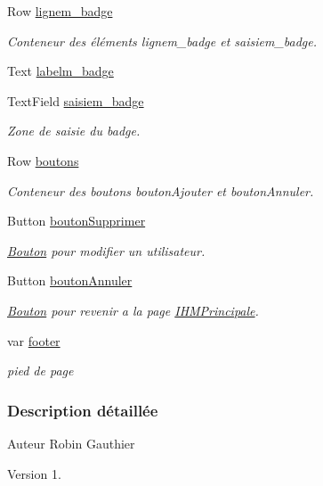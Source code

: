 \begin{DoxyCompactItemize}
Row \hyperlink{class_suppression_utilisateur_aac10ddea828370ac66dd5aea92156cd5}{lignem\+\_\+badge}
\begin{DoxyCompactList}\small\item\em Conteneur des éléments lignem\+\_\+badge et saisiem\+\_\+badge. \end{DoxyCompactList}\item 
Text \hyperlink{class_suppression_utilisateur_a91d57d71064eb0abad23df365497a231}{labelm\+\_\+badge}
\item 
Text\+Field \hyperlink{class_suppression_utilisateur_afc8452e1fde76e4781fced5e0ff6a505}{saisiem\+\_\+badge}
\begin{DoxyCompactList}\small\item\em Zone de saisie du badge. \end{DoxyCompactList}\item 
Row \hyperlink{class_suppression_utilisateur_a76e9219fdaadbb4fe85cabfb082f76ac}{boutons}
\begin{DoxyCompactList}\small\item\em Conteneur des boutons bouton\+Ajouter et bouton\+Annuler. \end{DoxyCompactList}\item 
Button \hyperlink{class_suppression_utilisateur_a8e5fef4c9fdf033f8893d7855bb10690}{bouton\+Supprimer}
\begin{DoxyCompactList}\small\item\em \hyperlink{class_bouton}{Bouton} pour modifier un utilisateur. \end{DoxyCompactList}\item 
Button \hyperlink{class_suppression_utilisateur_a466fba67110a8562cade1351fdf32fbd}{bouton\+Annuler}
\begin{DoxyCompactList}\small\item\em \hyperlink{class_bouton}{Bouton} pour revenir a la page \hyperlink{class_i_h_m_principale}{I\+H\+M\+Principale}. \end{DoxyCompactList}\item 
var \hyperlink{class_suppression_utilisateur_aeb091b46a9b92dd54b1353fc52769cf3}{footer}
\begin{DoxyCompactList}\small\item\em pied de page \end{DoxyCompactList}\end{DoxyCompactItemize}


\subsubsection{Description détaillée}
\begin{DoxyAuthor}{Auteur}
Robin Gauthier
\end{DoxyAuthor}
\begin{DoxyVersion}{Version}
1. 
\end{DoxyVersion}



